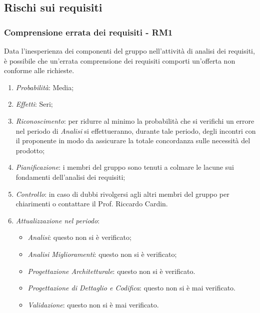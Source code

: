 \subsection{Rischi sui requisiti}
\subsubsection{Comprensione errata dei requisiti - RM1}
Data l'inesperienza dei componenti del gruppo nell'attivit\`a di analisi dei requisiti, \`e possibile che un'errata comprensione dei requisiti comporti un'offerta non conforme alle richieste.
\begin{enumerate}
\item \textit{Probabilit\`a}: Media;
\item \textit{Effetti}: Seri;
\item \textit{Riconoscimento}: per ridurre al minimo la probabilità che si verifichi un errore nel periodo di \textit{Analisi} si effettueranno, durante tale periodo, degli incontri con il proponente in modo da assicurare la totale concordanza sulle necessità del prodotto;
\item \textit{Pianificazione}: i membri del gruppo sono tenuti a colmare le lacune sui fondamenti dell'analisi dei requisiti;
\item \textit{Controllo}: in caso di dubbi rivolgersi agli altri membri del gruppo per chiarimenti o contattare il Prof. Riccardo Cardin.
\item \textit{Attualizzazione nel periodo}: 
	\begin{itemize}
	\item \textit{Analisi}: questo  non si è verificato;
	\item \textit{Analisi Miglioramenti}: questo  non si è verificato;
	\item \textit{Progettazione Architetturale}: questo  non si è verificato.
	\item \textit{Progettazione di Dettaglio e Codifica}: questo  non si è mai verificato.
	\item \textit{Validazione}: questo  non si è mai verificato.
	\end{itemize}
\end{enumerate}

